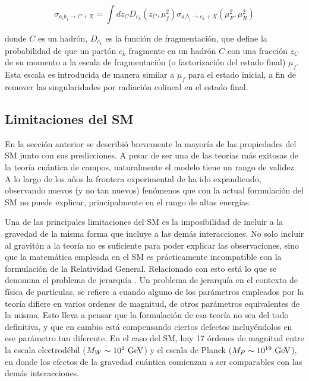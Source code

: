 \begin{equation}
	\sigma_{a_i b_j \to C+X} = \int dz_{C} D_{c_k}(z_C, \mu_{f}^2) \sigma_{a_i b_j \to c_k + X}(\mu_{F}^2, \mu_{R}^2)
\end{equation}

donde $C$ es un hadrón, $D_{c_k}$ es la función de fragmentación, que define la probabilidad
de que un partón $c_k$ fragmente en un hadrón $C$ con una fracción $z_C$ de su momento a la
escala de fragmentación (o factorización del estado final) $\mu_{f}$. Esta escala es introducida
de manera similar a $\mu_{f}$ para el estado inicial, a fin de remover las singularidades por
radiación colineal en el estado final.














\subsection{Limitaciones del SM}

En la sección anterior se describió brevemente la mayoría de las propiedades del SM junto con sus predicciones. A pesar de ser una de las teorías más exitosas de la teoría cuántica de campos, naturalmente el modelo tiene un rango de validez. A lo largo de los años la frontera experimental de ha ido expandiendo, observando nuevos (y no tan nuevos) fenómenos que con la actual formulación del SM no puede explicar, principalmente en el rango de altas energías.

Una de las principales limitaciones del SM es la imposibilidad de incluir a la gravedad de la misma forma que incluye a las demás interacciones. No solo incluir al gravitón a la teoría no es suficiente para poder explicar las observaciones, sino que la matemática empleada en el SM es prácticamente incompatible con la formulación de la Relatividad General. Relacionado con esto está lo que se denomina el problema de jerarquía \cite{hierarchy}. Un problema de jerarquía en el contexto de física de partículas, se refiere a cuando alguno de los parámetros empleados por la teoría difiere en varios ordenes de magnitud, de otros parámetros equivalentes de la misma. Esto lleva a pensar que la formulación de esa teoría no sea del todo definitiva, y que en cambio está compensando ciertos defectos incluyéndolos en ese parámetro tan diferente. En el caso del SM, hay 17 órdenes de magnitud entre la escala electrodébil ($M_W\sim 10^{2}\ \text{GeV}$) y el escala de Planck ($M_P\sim 10^{19}\ \gev$), en donde los efectos de la gravedad cuántica comienzan a ser comparables con las demás interacciones.

